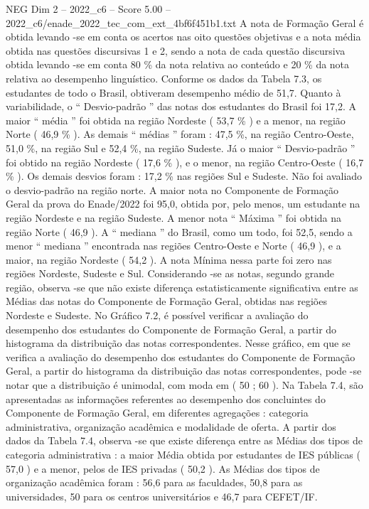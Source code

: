 \begin{textsample}{NEG Dim 2 – 2022\_c6 – Score 5.00 – 2022\_c6/enade\_2022\_tec\_com\_ext\_4bf6f451b1.txt}
A nota de Formação Geral é obtida levando -se em conta os acertos nas oito questões objetivas e a nota média obtida nas questões discursivas 1 e 2, sendo a nota de cada questão discursiva obtida levando -se em conta 80 \% da nota relativa ao conteúdo e 20 \% da nota relativa ao desempenho linguístico.
Conforme os dados da Tabela 7.3, os estudantes de todo o Brasil, obtiveram desempenho médio de 51,7.
Quanto à variabilidade, o “ Desvio-padrão ” das notas dos estudantes do Brasil foi 17,2.
A maior “ média ” foi obtida na região Nordeste ( 53,7 \% ) e a menor, na região Norte ( 46,9 \% ).
As demais “ médias ” foram : 47,5 \%, na região Centro-Oeste, 51,0 \%, na região Sul e 52,4 \%, na região Sudeste.
Já o maior “ Desvio-padrão ” foi obtido na região Nordeste ( 17,6 \% ), e o menor, na região Centro-Oeste ( 16,7 \% ).
Os demais desvios foram : 17,2 \% nas regiões Sul e Sudeste.
Não foi avaliado o desvio-padrão na região norte.
A maior nota no Componente de Formação Geral da prova do Enade/2022 foi 95,0, obtida por, pelo menos, um estudante na região Nordeste e na região Sudeste.
A menor nota “ Máxima ” foi obtida na região Norte ( 46,9 ).
A “ mediana ” do Brasil, como um todo, foi 52,5, sendo a menor “ mediana ” encontrada nas regiões Centro-Oeste e Norte ( 46,9 ), e a maior, na região Nordeste ( 54,2 ).
A nota Mínima nessa parte foi zero nas regiões Nordeste, Sudeste e Sul.
Considerando -se as notas, segundo grande região, observa -se que não existe diferença estatisticamente significativa entre as Médias das notas do Componente de Formação Geral, obtidas nas regiões Nordeste e Sudeste.
No Gráfico 7.2, é possível verificar a avaliação do desempenho dos estudantes do Componente de Formação Geral, a partir do histograma da distribuição das notas correspondentes.
Nesse gráfico, em que se verifica a avaliação do desempenho dos estudantes do Componente de Formação Geral, a partir do histograma da distribuição das notas correspondentes, pode -se notar que a distribuição é unimodal, com moda em ( 50 ; 60 ).
Na Tabela 7.4, são apresentadas as informações referentes ao desempenho dos concluintes do Componente de Formação Geral, em diferentes agregações : categoria administrativa, organização acadêmica e modalidade de oferta.
A partir dos dados da Tabela 7.4, observa -se que existe diferença entre as Médias dos tipos de categoria administrativa : a maior Média obtida por estudantes de IES públicas ( 57,0 ) e a menor, pelos de IES privadas ( 50,2 ).
As Médias dos tipos de organização acadêmica foram : 56,6 para as faculdades, 50,8 para as universidades, 50 para os centros universitários e 46,7 para CEFET/IF.

\end{textsample}
